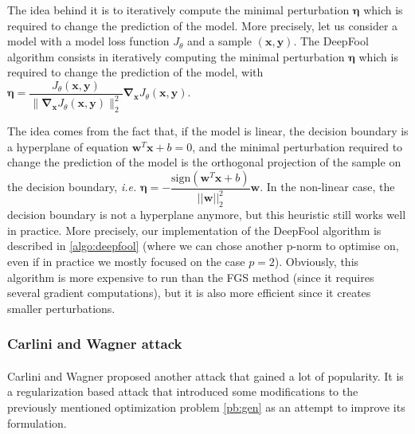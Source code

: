 \documentclass[11pt,twocolumn,letterpaper]{article}
\begin{document}
The idea behind it is to iteratively compute the minimal perturbation $\bm{\eta}$ which is required to change the prediction of the model. More precisely, let us consider a model with a model loss function $J_{\theta}$ and a sample $(\bm{x}, \bm{y})$. The DeepFool algorithm consists in iteratively computing the minimal perturbation $\bm{\eta}$ which is required to change the prediction of the model, with $\bm{\eta} = \dfrac{J_{\theta}(\bm{x}, \bm{y})}{\|\bm{\nabla}_{\bm{x}} J_{\theta}(\bm{x}, \bm{y})\|_2^2} \bm{\nabla}_{\bm{x}} J_{\theta}(\bm{x}, \bm{y})$. 

The idea comes from the fact that, if the model is linear, the decision boundary is a hyperplane of equation $\bm{w}^T\bm{x} + b = 0$, and the minimal perturbation required to change the prediction of the model is the orthogonal projection of the sample on the decision boundary, \textit{i.e.} $\bm{\eta} = - \dfrac{\text{sign}(\bm{w}^T\bm{x} + b)}{||\bm{w}||_2^2} \bm{w}$. In the non-linear case, the decision boundary is not a hyperplane anymore, but this heuristic still works well in practice. More precisely, our implementation of the DeepFool algorithm is described in \ref{algo:deepfool} (where we can chose another p-norm to optimise on, even if in practice we mostly focused on the case $p=2$).
Obviously, this algorithm is more expensive to run than the FGS method (since it requires several gradient computations), but it is also more efficient since it creates smaller perturbations.

\subsubsection{Carlini and Wagner attack}
\paragraph{}
Carlini and Wagner proposed another attack \cite{robustness} that gained a lot of popularity. It is a regularization based attack that introduced some modifications to the previously mentioned optimization problem \ref{pb:gen} as an attempt to improve its formulation.
\end{document}

